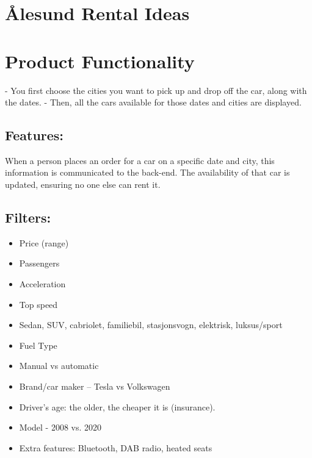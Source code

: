\documentclass{article}
\begin{document}
\section{Ålesund Rental Ideas}


\section{Product Functionality}

- You first choose the cities you want to pick up and drop off the car, along with the dates.
- Then, all the cars available for those dates and cities are displayed.

\subsection{Features:}

When a person places an order for a car on a specific date and city, this information is communicated to the back-end. The availability of that car is updated, ensuring no one else can rent it.

\subsection{Filters:}
\begin{itemize}
    \item Price (range)
    \item Passengers
    \item Acceleration
    \item Top speed
    \item Sedan, SUV, cabriolet, familiebil, stasjonsvogn, elektrisk, luksus/sport
    \item Fuel Type
    \item Manual vs automatic
    \item Brand/car maker – Tesla vs Volkswagen
    \item Driver's age: the older, the cheaper it is (insurance).
    \item Model - 2008 vs. 2020
    \item Extra features: Bluetooth, DAB radio, heated seats
\end{itemize}
\end{document}
